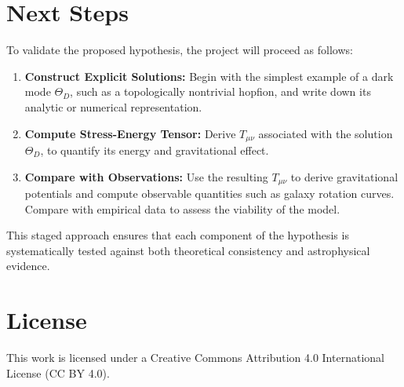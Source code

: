 \documentclass[12pt]{article}
\begin{document}
\section*{Next Steps}
To validate the proposed hypothesis, the project will proceed as follows:

\begin{enumerate}
  \item \textbf{Construct Explicit Solutions:} Begin with the simplest example of a dark mode \( \Theta_D \), such as a topologically nontrivial hopfion, and write down its analytic or numerical representation.
  \item \textbf{Compute Stress-Energy Tensor:} Derive \( T_{\mu\nu} \) associated with the solution \( \Theta_D \), to quantify its energy and gravitational effect.
  \item \textbf{Compare with Observations:} Use the resulting \( T_{\mu\nu} \) to derive gravitational potentials and compute observable quantities such as galaxy rotation curves. Compare with empirical data to assess the viability of the model.
\end{enumerate}

This staged approach ensures that each component of the hypothesis is systematically tested against both theoretical consistency and astrophysical evidence.


\section*{License}
This work is licensed under a Creative Commons Attribution 4.0 International License (CC BY 4.0).
\end{document}
